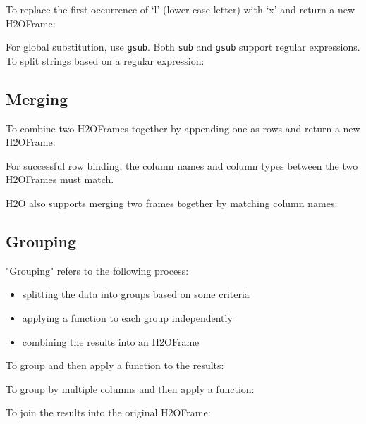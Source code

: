 {To replace the first occurrence of `l' (lower case letter) with `x' and return a new H2OFrame:


For global substitution, use {\texttt{gsub}}.  Both {\texttt{sub}} and {\texttt{gsub}} support regular expressions. To split strings based on a regular expression:



\subsection{Merging}
To combine two H2OFrames together by appending one as rows and return a new H2OFrame:


For successful row binding, the column names and column types between the two H2OFrames must match.

H2O also supports merging two frames together by matching column names:


\newpage

\subsection{Grouping}

"Grouping" refers to the following process:

\begin{itemize}
\item splitting the data into groups based on some criteria 
\item applying a function to each group independently
\item combining the results into an H2OFrame
\end{itemize}

To group and then apply a function to the results:


To group by multiple columns and then apply a function:


\newpage

To join the results into the original H2OFrame:


}
